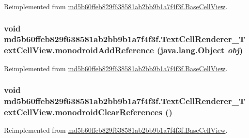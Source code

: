 Reimplemented from \hyperlink{classmd5b60ffeb829f638581ab2bb9b1a7f4f3f_1_1_base_cell_view_f945c6cd310f27f3f6ed7c0198a20d8c}{md5b60ffeb829f638581ab2bb9b1a7f4f3f.BaseCellView}.\hypertarget{classmd5b60ffeb829f638581ab2bb9b1a7f4f3f_1_1_text_cell_renderer___text_cell_view_fc8a91c0d40ccce034289e75cb64e36a}{
\subsubsection[{monodroidAddReference}]{\setlength{\rightskip}{0pt plus 5cm}void md5b60ffeb829f638581ab2bb9b1a7f4f3f.TextCellRenderer\_\-TextCellView.monodroidAddReference (java.lang.Object {\em obj})}}
\label{classmd5b60ffeb829f638581ab2bb9b1a7f4f3f_1_1_text_cell_renderer___text_cell_view_fc8a91c0d40ccce034289e75cb64e36a}




Reimplemented from \hyperlink{classmd5b60ffeb829f638581ab2bb9b1a7f4f3f_1_1_base_cell_view_7064411ae8713f07abf9855828ab5d7a}{md5b60ffeb829f638581ab2bb9b1a7f4f3f.BaseCellView}.\hypertarget{classmd5b60ffeb829f638581ab2bb9b1a7f4f3f_1_1_text_cell_renderer___text_cell_view_8a90317f45055f6bdc8b99196ff5d3c5}{
\subsubsection[{monodroidClearReferences}]{\setlength{\rightskip}{0pt plus 5cm}void md5b60ffeb829f638581ab2bb9b1a7f4f3f.TextCellRenderer\_\-TextCellView.monodroidClearReferences ()}}
\label{classmd5b60ffeb829f638581ab2bb9b1a7f4f3f_1_1_text_cell_renderer___text_cell_view_8a90317f45055f6bdc8b99196ff5d3c5}




Reimplemented from \hyperlink{classmd5b60ffeb829f638581ab2bb9b1a7f4f3f_1_1_base_cell_view_bd00d7bfaf56776cb2df98366ee775d7}{md5b60ffeb829f638581ab2bb9b1a7f4f3f.BaseCellView}.


